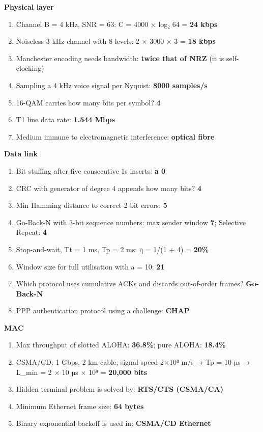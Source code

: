 \textbf{Physical layer}

\begin{enumerate}
\def\labelenumi{\arabic{enumi}.}
\setcounter{enumi}{6}
\tightlist
\item
  Channel B = 4 kHz, SNR = 63: C = 4000 × log₂ 64 = \textbf{24 kbps}
\item
  Noiseless 3 kHz channel with 8 levels: 2 × 3000 × 3 = \textbf{18 kbps}
\item
  Manchester encoding needs bandwidth: \textbf{twice that of NRZ} (it is self-clocking)
\item
  Sampling a 4 kHz voice signal per Nyquist: \textbf{8000 samples/s}
\item
  16-QAM carries how many bits per symbol? \textbf{4}
\item
  T1 line data rate: \textbf{1.544 Mbps}
\item
  Medium immune to electromagnetic interference: \textbf{optical fibre}
\end{enumerate}

\textbf{Data link}

\begin{enumerate}
\def\labelenumi{\arabic{enumi}.}
\setcounter{enumi}{13}
\tightlist
\item
  Bit stuffing after five consecutive 1s inserts: \textbf{a 0}
\item
  CRC with generator of degree 4 appends how many bits? \textbf{4}
\item
  Min Hamming distance to correct 2-bit errors: \textbf{5}
\item
  Go-Back-N with 3-bit sequence numbers: max sender window \textbf{7}; Selective Repeat: \textbf{4}
\item
  Stop-and-wait, Tt = 1 ms, Tp = 2 ms: η = 1/(1 + 4) = \textbf{20\%}
\item
  Window size for full utilisation with a = 10: \textbf{21}
\item
  Which protocol uses cumulative ACKs and discards out-of-order frames? \textbf{Go-Back-N}
\item
  PPP authentication protocol using a challenge: \textbf{CHAP}
\end{enumerate}

\textbf{MAC}

\begin{enumerate}
\def\labelenumi{\arabic{enumi}.}
\setcounter{enumi}{21}
\tightlist
\item
  Max throughput of slotted ALOHA: \textbf{36.8\%}; pure ALOHA: \textbf{18.4\%}
\item
  CSMA/CD: 1 Gbps, 2 km cable, signal speed 2×10⁸ m/s → Tp = 10 µs → L\_min = 2 × 10 µs × 10⁹ = \textbf{20,000 bits}
\item
  Hidden terminal problem is solved by: \textbf{RTS/CTS (CSMA/CA)}
\item
  Minimum Ethernet frame size: \textbf{64 bytes}
\item
  Binary exponential backoff is used in: \textbf{CSMA/CD Ethernet}
\end{enumerate}

